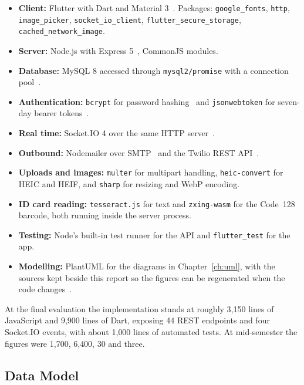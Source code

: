 \documentclass{tietreport}
\begin{document}
\begin{itemize}[nosep]
  \item \raggedright\textbf{Client:} Flutter with Dart and Material 3~\cite{flutter2026}. Packages:
        \texttt{google\_fonts}, \texttt{http}, \texttt{image\_picker},
        \texttt{socket\_io\_client}, \texttt{flutter\_secure\_storage},
        \texttt{cached\_network\_image}.
  \item \textbf{Server:} Node.js with Express 5~\cite{express2026}, CommonJS modules.
  \item \textbf{Database:} MySQL 8 accessed through \texttt{mysql2/promise} with a
        connection pool~\cite{mysql2026}.
  \item \textbf{Authentication:} \texttt{bcrypt} for password hashing~\cite{provos1999}
        and \texttt{jsonwebtoken} for seven-day bearer tokens~\cite{rfc7519}.
  \item \textbf{Real time:} Socket.IO 4 over the same HTTP server~\cite{socketio2026}.
  \item \textbf{Outbound:} Nodemailer over SMTP~\cite{nodemailer2026} and the Twilio
        REST API~\cite{twilio2026}.
  \item \textbf{Uploads and images:} \texttt{multer} for multipart handling,
        \texttt{heic-convert} for HEIC and HEIF, and \texttt{sharp} for resizing and
        WebP encoding.
  \item \textbf{ID card reading:} \texttt{tesseract.js} for text and \texttt{zxing-wasm}
        for the Code~128 barcode, both running inside the server process.
  \item \textbf{Testing:} Node's built-in test runner for the API and
        \texttt{flutter\_test} for the app.
  \item \textbf{Modelling:} PlantUML for the diagrams in Chapter~\ref{ch:uml}, with the
        sources kept beside this report so the figures can be regenerated when the code
        changes~\cite{plantuml2026}.
\end{itemize}

\noindent At the final evaluation the implementation stands at roughly 3{,}150 lines of
JavaScript and 9{,}900 lines of Dart, exposing 44 REST endpoints and four Socket.IO
events, with about 1{,}000 lines of automated tests. At mid-semester the figures were
1{,}700, 6{,}400, 30 and three.

\subsection{Data Model}
\end{document}
